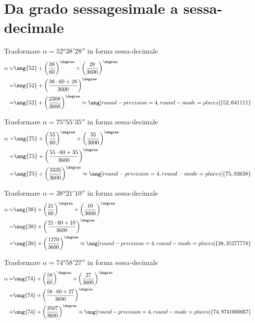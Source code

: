 \section{Da grado sessagesimale a sessa-decimale}
 \tcbstartrecording
 \begin{exercise}
Trasformare $\alpha=\ang{52;38;28}$ in forma sessa-decimale
\tcblower
\begin{align*}
\alpha=&\ang{52}+\left(\dfrac{38}{60}\right)^{\degree }+\left(\dfrac{28}{3600}\right)^{\degree }\\
=&\ang{52}+\left(\dfrac{38\cdot60+28}{3600}\right)^{\degree }\\
=&\ang{52}+\left(\dfrac{2308}{3600}\right)^{\degree }\approx\ang[round-precision=\lungarrotandamento,round-mode=places]{52,641111}
\end{align*}
\end{exercise}
 \begin{exercise}
 	Trasformare  $\alpha=\ang{75;55;35}$ in forma sessa-decimale
 	\tcblower
 	\begin{align*}
 	\alpha=&\ang{75}+\left(\dfrac{55}{60}\right)^{\degree }+\left(\dfrac{35}{3600}\right)^{\degree }\\
 	=&\ang{75}+\left(\dfrac{55\cdot60+35}{3600}\right)^{\degree}\\
 	=&\ang{75}+\left(\dfrac{3335}{3600}\right)^{\degree}\approx\ang[round-precision=\lungarrotandamento,round-mode=places]{75,92638}
 	\end{align*}
 \end{exercise}
  \begin{exercise}
  	Trasformare  $\alpha=\ang{38;21;10}$ in forma sessa-decimale
  	\tcblower
  	\begin{align*}
  	\alpha=&\ang{38}+\left(\dfrac{21}{60}\right)^{\degree }+\left(\dfrac{10}{3600}\right)^{\degree }\\
  	=&\ang{38}+\left(\dfrac{21\cdot60+10}{3600}\right)^{\degree}\\
  	=&\ang{38}+\left(\dfrac{1270}{3600}\right)^{\degree}\approx\ang[round-precision=\lungarrotandamento,round-mode=places]{38,35277778}
  	\end{align*}
  \end{exercise}
  \begin{exercise}
  	Trasformare  $\alpha=\ang{74;58;27}$ in forma sessa-decimale
  	\tcblower
  	\begin{align*}
  	\alpha=&\ang{74}+\left(\dfrac{58}{60}\right)^{\degree }+\left(\dfrac{27}{3600}\right)^{\degree }\\
  	=&\ang{74}+\left(\dfrac{58\cdot60+27}{3600}\right)^{\degree}\\
  	=&\ang{74}+\left(\dfrac{3507}{3600}\right)^{\degree}\approx\ang[round-precision=\lungarrotandamento,round-mode=places]{74,9741666667}
  	\end{align*}
  \end{exercise}
